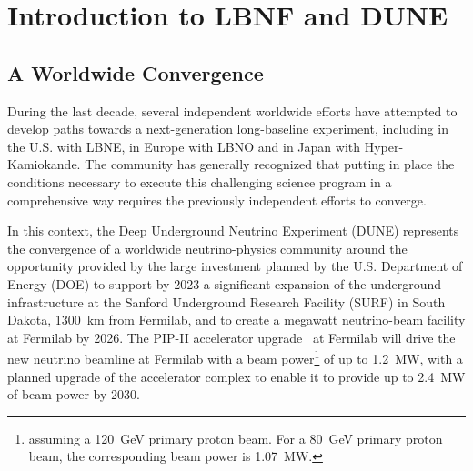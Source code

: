 

\chapter{Introduction to LBNF and DUNE}
\label{ch:project-overview}

%
%
\section{A Worldwide Convergence}

During the last decade, several independent worldwide efforts have attempted to develop paths towards a next-generation long-baseline experiment, including in the U.S. with LBNE, in Europe with LBNO and in Japan with Hyper-Kamiokande. The community has %
generally recognized that putting in place %
the conditions necessary to 
execute this challenging science program in a comprehensive way requires the previously independent 
efforts to converge. %

In this context, the Deep Underground Neutrino Experiment (DUNE) represents the convergence of a worldwide neutrino-physics community around the opportunity provided by the 
large investment planned by the U.S. Department of Energy (DOE) to support by 2023 a significant expansion of the underground infrastructure at the Sanford Underground Research 
Facility (SURF) in South Dakota, \SI{1300}{\km} from Fermilab, and to create a megawatt neutrino-beam facility at Fermilab by 2026.  The PIP-II accelerator upgrade~\cite{pip2-2013} at 
Fermilab will drive the new neutrino beamline at Fermilab with a beam power\footnote{assuming a \SI{120}{\GeV} primary proton beam. For a \SI{80}{\GeV} primary proton beam, the corresponding beam power is \SI{1.07}{\MW}.} of up to \SI{1.2}{\MW}, with a planned upgrade 
of the accelerator complex to enable it to provide up to \SI{2.4}{\MW} of beam power by 2030.  

